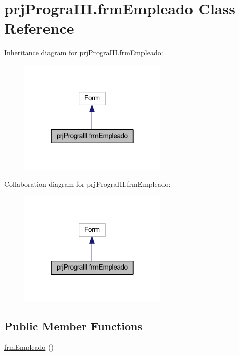 \hypertarget{classprj_progra_i_i_i_1_1frm_empleado}{}\section{prj\+Progra\+I\+I\+I.\+frm\+Empleado Class Reference}
\label{classprj_progra_i_i_i_1_1frm_empleado}


Inheritance diagram for prj\+Progra\+I\+I\+I.\+frm\+Empleado\+:
\nopagebreak
\begin{figure}[H]
\begin{center}
\leavevmode
\includegraphics[width=202pt]{classprj_progra_i_i_i_1_1frm_empleado__inherit__graph}
\end{center}
\end{figure}


Collaboration diagram for prj\+Progra\+I\+I\+I.\+frm\+Empleado\+:
\nopagebreak
\begin{figure}[H]
\begin{center}
\leavevmode
\includegraphics[width=202pt]{classprj_progra_i_i_i_1_1frm_empleado__coll__graph}
\end{center}
\end{figure}
\subsection*{Public Member Functions}
\begin{DoxyCompactItemize}
\item 
\hyperlink{classprj_progra_i_i_i_1_1frm_empleado_a8e98a0755332ce950f8f863b4c364398}{frm\+Empleado} ()
\end{DoxyCompactItemize}
